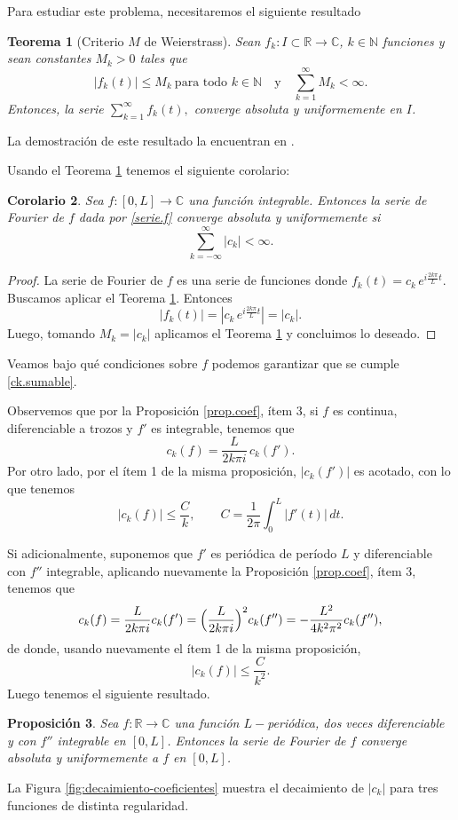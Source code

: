 \documentclass[12pt, a4paper]{amsbook}
\newcommand{\R}{{\mathbb R}}
\newcommand{\C}{{\mathbb C}}
\newcommand{\N}{{\mathbb N}}
\newtheorem{teo}{Teorema}[section]
\newtheorem{prop}[teo]{Proposición}
\newtheorem{cor}[teo]{Corolario}
\theoremstyle{remark}
\theoremstyle{definition}
\numberwithin{section}{chapter}
\numberwithin{subsection}{section}
\numberwithin{equation}{section}
\numberwithin{figure}{chapter}
\begin{document}
Para estudiar este problema, necesitaremos el siguiente resultado
\begin{teo}[Criterio $M$ de Weierstrass]\label{MdeW}
Sean $f_k\colon I\subset \R\to \C$, $k\in\N$ funciones y sean constantes $M_k>0$ tales que
$$
|f_k(t)|\le M_k\ \text{para todo } k\in\N\quad \text{y}\quad \sum_{k=1}^\infty M_k <\infty.
$$
Entonces, la serie $\sum_{k=1}^\infty f_k(t),$ converge absoluta y uniformemente en $I$.
\end{teo}

La demostración de este resultado la encuentran en \cite{Rudin}.

Usando el Teorema \ref{MdeW} tenemos el siguiente corolario:

\begin{cor}\label{cor.unif}
Sea $f\colon [0, L]\to\C$ una función integrable. Entonces la serie de Fourier de $f$ dada por \eqref{serie.f} converge absoluta y uniformemente si
\begin{equation}\label{ck.sumable}
\sum_{k=-\infty}^\infty |c_k| <\infty.
\end{equation}
\end{cor}

\begin{proof}
La serie de Fourier de $f$ es una serie de funciones donde $f_k(t) = c_k\, e^{i\frac{2k\pi}{L}t}$. Buscamos aplicar el Teorema \ref{MdeW}. Entonces
$$
|f_k(t)| = |c_k\, e^{i\frac{2k\pi}{L}t}| = |c_k|.
$$
Luego, tomando $M_k=|c_k|$ aplicamos el Teorema \ref{MdeW} y concluimos lo deseado.
\end{proof}

Veamos bajo qué condiciones sobre $f$ podemos garantizar que se cumple \eqref{ck.sumable}.

Observemos que por la Proposición \ref{prop.coef}, ítem 3, si $f$ es continua, diferenciable a trozos y $f'$ es integrable, tenemos que
$$
c_k(f) = \frac{L}{2k\pi i}\, c_k(f').
$$
Por otro lado, por el ítem 1 de la misma proposición, $|c_k(f')|$ es acotado, con lo que tenemos
$$
|c_k(f)|\le \frac{C}{k},\qquad C=\frac{1}{2\pi}\int_0^L |f'(t)|\, dt. 
$$

Si adicionalmente, suponemos que $f'$ es periódica de período $L$ y diferenciable con $f''$ integrable, aplicando nuevamente la Proposición \ref{prop.coef}, ítem 3, tenemos que
$$
c_k(f) = \frac{L}{2k\pi i} c_k(f') = \Bigl(\frac{L}{2k\pi i}\Bigr)^2c_k(f'') = -\frac{L^2}{4k^2\pi^2} c_k(f''),
$$
de donde, usando nuevamente el ítem 1 de la misma proposición,
\begin{equation}\label{ck.k2}
|c_k(f)|\le \frac{C}{k^2}.
\end{equation}
Luego tenemos el siguiente resultado.
\begin{prop}\label{prop.unif}
Sea $f\colon \R\to\C$ una función $L-$periódica, dos veces diferenciable y con $f''$ integrable en $[0,L]$. Entonces la serie de Fourier de $f$ converge absoluta y uniformemente a $f$ en $[0,L]$.
\end{prop}
La Figura \ref{fig:decaimiento-coeficientes} muestra el decaimiento de $|c_k|$ para tres funciones de distinta regularidad.
\end{document}
